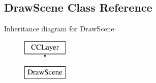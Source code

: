 \hypertarget{interface_draw_scene}{\subsection{Draw\-Scene Class Reference}
\label{df/dce/interface_draw_scene}
}
Inheritance diagram for Draw\-Scene\-:\begin{figure}[H]
\begin{center}
\leavevmode
\includegraphics[height=2.000000cm]{df/dce/interface_draw_scene}
\end{center}
\end{figure}

